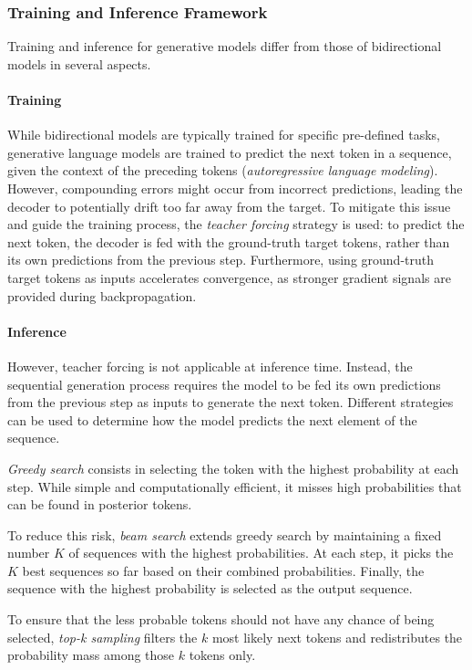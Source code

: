 \subsubsection{Training and Inference Framework}

Training and inference for generative models differ from those of bidirectional models in several aspects.

\paragraph{Training} While bidirectional models are typically trained for specific pre-defined tasks, generative language models are trained to predict the next token in a sequence, given the context of the preceding tokens (\textit{autoregressive language modeling}). However, compounding errors might occur from incorrect predictions, leading the decoder to potentially drift too far away from the target. To mitigate this issue and guide the training process, the \textit{teacher forcing} strategy is used: to predict the next token, the decoder is fed with the ground-truth target tokens, rather than its own predictions from the previous step. Furthermore, using ground-truth target tokens as inputs accelerates convergence, as stronger gradient signals are provided during backpropagation.

\paragraph{Inference} However, teacher forcing is not applicable at inference time. Instead, the sequential generation process requires the model to be fed its own predictions from the previous step as inputs to generate the next token. Different strategies can be used to determine how the model predicts the next element of the sequence. 

\textit{Greedy search} consists in selecting the token with the highest probability at each step. While simple and computationally efficient, it misses high probabilities that can be found in posterior tokens. 

To reduce this risk, \textit{beam search} extends greedy search by maintaining a fixed number $K$  of sequences with the highest probabilities. At each step, it picks the $K$ best sequences so far based on their combined probabilities. Finally, the sequence with the highest probability is selected as the output sequence.

To ensure that the less probable tokens should not have any chance of being selected, \textit{top-k sampling} \citep{fan2018hierarchical} filters the $k$ most likely next tokens and redistributes the probability mass among those $k$ tokens only. 

